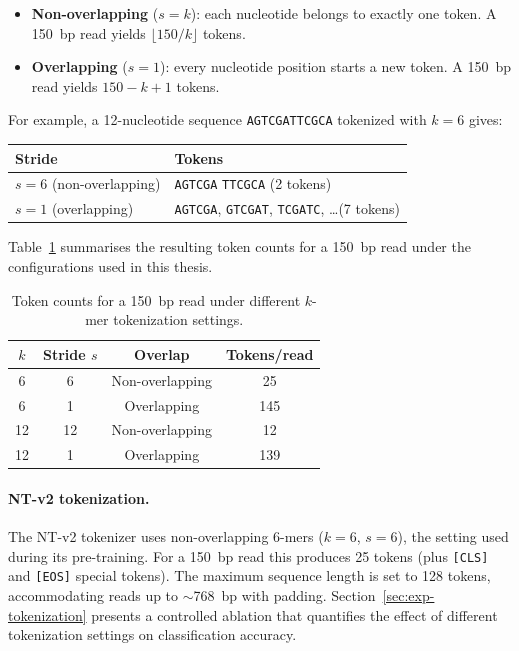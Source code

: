 \begin{itemize}
    \item \textbf{Non-overlapping} ($s = k$): each nucleotide belongs to exactly one token.
          A 150~bp read yields $\lfloor 150 / k \rfloor$ tokens.
    \item \textbf{Overlapping} ($s = 1$): every nucleotide position starts a new token.
          A 150~bp read yields $150 - k + 1$ tokens.
\end{itemize}

For example, a 12-nucleotide sequence \texttt{AGTCGATTCGCA} tokenized with $k{=}6$ gives:

\begin{center}
\begin{tabular}{ll}
    \toprule
    Stride & Tokens \\
    \midrule
    $s{=}6$ (non-overlapping) & \texttt{AGTCGA} \quad \texttt{TTCGCA} \quad (2 tokens) \\
    $s{=}1$ (overlapping)     & \texttt{AGTCGA}, \texttt{GTCGAT}, \texttt{TCGATC}, \ldots \quad (7 tokens) \\
    \bottomrule
\end{tabular}
\end{center}

Table~\ref{tab:tokenization-counts} summarises the resulting token counts for a 150~bp read under the configurations used in this thesis.

\begin{table}[htbp]
    \centering
    \caption{Token counts for a 150~bp read under different $k$-mer tokenization settings.}
    \label{tab:tokenization-counts}
    \begin{tabular}{cccc}
        \toprule
        $k$ & Stride $s$ & Overlap & Tokens/read \\
        \midrule
        6  & 6 & Non-overlapping & 25 \\
        6  & 1 & Overlapping     & 145 \\
        12 & 12 & Non-overlapping & 12 \\
        12 & 1  & Overlapping     & 139 \\
        \bottomrule
    \end{tabular}
\end{table}

\paragraph{NT-v2 tokenization.}
The NT-v2 tokenizer uses non-overlapping 6-mers ($k{=}6$, $s{=}6$), the setting used during its pre-training. For a 150~bp read this produces 25 tokens (plus \texttt{[CLS]} and \texttt{[EOS]} special tokens). The maximum sequence length is set to 128 tokens, accommodating reads up to $\sim$768~bp with padding. Section~\ref{sec:exp-tokenization} presents a controlled ablation that quantifies the effect of different tokenization settings on classification accuracy.

